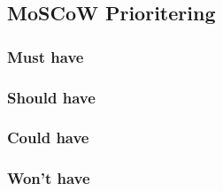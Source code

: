 \subsection{MoSCoW Prioritering}
\subsubsection{Must have}
\subsubsection{Should have}
\subsubsection{Could have}
\subsubsection{Won't have}